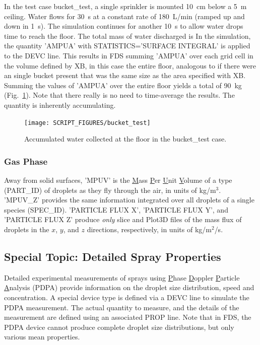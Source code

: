 \documentclass[11pt]{book}
\begin{document}
In the test case {\ct bucket\_test}, a single sprinkler is
mounted 10~cm below a 5~m ceiling. Water flows for 30~s at a constant
rate of 180~L/min (ramped up and down in 1~s).  The simulation continues for another 10~s to allow
water drops time to reach the floor. The total mass of water discharged is
\be
\ee
In the simulation, the quantity {\ct 'AMPUA'} with {\ct STATISTICS='SURFACE INTEGRAL'} is applied to the {\ct DEVC} line.  This results in FDS summing {\ct 'AMPUA'} over each grid cell in the volume defined by {\ct XB}, in this case the entire floor, analogous to if there were an single bucket present that was the same size as the area specified with {\ct XB}.
Summing the values of {\ct 'AMPUA'} over the entire
floor yields a total of 90~kg (Fig.~\ref{bucket_test_fig}). Note that there really is no need to time-average the results. The quantity is inherently accumulating.

\begin{figure}[ht]
\centering
\texttt{[image: SCRIPT\_FIGURES/bucket\_test]}
\caption[Results of the {\ct bucket\_test} case]{Accumulated water collected at the floor in the {\ct bucket\_test} case.}
\label{bucket_test_fig}
\end{figure}


\subsubsection{Gas Phase}

Away from solid surfaces, {\ct 'MPUV'} is the \underline{M}ass \underline{P}er \underline{U}nit \underline{V}olume of a type ({\ct PART\_ID}) of  droplets as they fly through
the air, in units of kg/m$^3$.  {\ct 'MPUV\_Z'} provides the same information integrated over all droplets of a single species ({\ct SPEC\_ID}).  {\ct 'PARTICLE FLUX X'},  {\ct 'PARTICLE FLUX Y'}, and {\ct 'PARTICLE FLUX Z'} produce {\em only} slice and Plot3D files
of the mass flux of droplets in the $x$, $y$, and $z$ directions, respectively, in units of kg/m$^2$/s.



\subsection{Special Topic: Detailed Spray Properties}
\label{PDPA}

Detailed experimental measurements of sprays using \underline{P}hase \underline{D}oppler \underline{P}article
\underline{A}nalysis (PDPA) provide information on the droplet size distribution, speed and concentration.
A special device type is defined via a {\ct DEVC} line to simulate the PDPA measurement. The actual quantity to measure, and the details of the
measurement are defined using an associated {\ct PROP} line. Note that in FDS, the PDPA device cannot produce complete droplet size
distributions, but only various mean properties.
\end{document}

